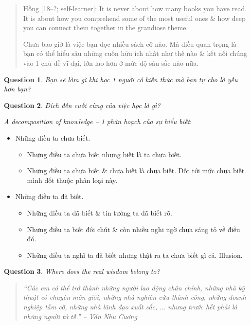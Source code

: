 \documentclass[12pt]{article}
\newtheorem{question}{Question}
\begin{document}
\begin{quote}
	{\sf Hồng [18--?; self-learner]}: It is never about how many books you have read. It is about how you comprehend some of the most useful ones \& how deep you can connect them together in the grandiose theme.
	
	Chưa bao giờ là việc bạn đọc nhiều sách cỡ nào. Mà điều quan trọng là bạn có thể hiểu sâu những cuốn hữu ích nhất như thế nào \& kết nối chúng vào 1 chủ đề vĩ đại, lớn lao hơn ở mức độ sâu sắc nào nữa.
\end{quote}


\begin{question}
	Bạn sẽ làm gì khi học 1 người có kiến thức mà bạn tự cho là yếu hơn bạn?
\end{question}

\begin{question}
	Đích đến cuối cùng của việc học là gì?
\end{question}

{\it A decomposition of knowledge -- 1 phân hoạch của sự hiểu biết}:
\begin{itemize}
	\item Những điều ta chưa biết.
	\begin{itemize}
		\item Những điều ta chưa biết nhưng biết là ta chưa biết.
		\item Những điều ta chưa biết \& chưa biết là chưa biết. Dốt tới mức chưa biết mình dốt thuộc phân loại này.
	\end{itemize}
	\item Những điều ta đã biết.
	\begin{itemize}
		\item Những điều ta đã biết \& tin tưởng ta đã biết rõ.
		\item Những điều ta biết đôi chút \& còn nhiều nghi ngờ chưa sáng tỏ về điều đó.
		\item Những điều ta nghĩ ta đã biết nhưng thật ra ta chưa biết gì cả. Illusion.
	\end{itemize}
\end{itemize}

\begin{question}
	Where does the real wisdom belong to?
\end{question}

\begin{quotation}\it
	``Các em có thể trở thành những người lao động chân chính, những nhà kỹ thuật có chuyên môn giỏi, những nhà nghiên cứu thành công, những doanh nghiệp tầm cỡ, những nhà lãnh đạo xuất sắc, $\ldots$ nhưng trước hết phải là những người tử tế.'' -- {\sc Văn Như Cương}
\end{quotation}
\end{document}
